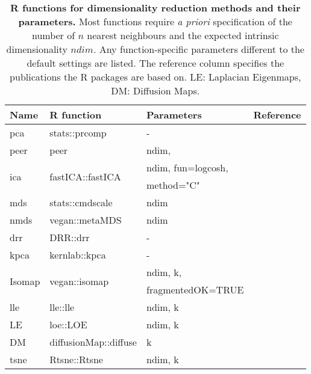 \begin{table}[htbp]
  \centering
  \caption[\textbf{R functions for dimensionality reduction methods and their parameters.}]{\textbf{R functions for dimensionality reduction methods and their parameters.} Most functions require \textit{a priori} specification of the number of \(n\) nearest neighbours and the expected intrinsic dimensionality \(ndim\). Any function-specific parameters different to the default settings are listed. The reference column specifies the publications the R packages are based on. LE: Laplacian Eigenmaps, DM: Diffusion Maps.}
  \begin{small}
    \begin{tabular}{lllr}
    \toprule
    Name  & R function & Parameters & Reference \\
    \midrule
    \gls{pca}   & stats::prcomp &  -    & \citep{Hotelling1933} \\
    \gls{peer} & peer  & ndim,  & \citep{Stegle2010} \\
    \multirow{2}[0]{*}{\gls{ica}} & \multirow{2}[0]{*}{fastICA::fastICA} & ndim, fun=logcosh, & \multirow{2}[0]{*}{\citep{Hyvarinen2000}} \\
          &       &  method="C" &  \\
    \gls{mds}   & stats::cmdscale & ndim  & \citep{Gower1966} \\
    \gls{nmds}  & vegan::metaMDS & ndim  & \citep{Ripley1996} \\
    \gls{drr}   & DRR::drr &  -    & \citep{Laparra2015} \\
    \gls{kpca}  & kernlab::kpca &  -    & \citep{Schoelkopf1998} \\
    \multirow{2}[0]{*}{Isomap} & \multirow{2}[0]{*}{vegan::isomap} & ndim, k, & \multirow{2}[0]{*}{\citep{Tenenbaum2000}} \\
          &       & fragmentedOK=TRUE &  \\
    \gls{lle}   & lle::lle & ndim, k & \citep{deRidder2002} \\
    LE & loe::LOE & ndim, k & \citep{Belkin2003} \\
    DM & diffusionMap::diffuse & k     & \citep{Lafon2006} \\
    \gls{tsne}  & Rtsne::Rtsne & ndim, k & \citep{Maaten2008} \\
    \bottomrule
    \end{tabular}%
 \end{small}
 \label{tab:dimRed-R}%
\end{table}%
%
